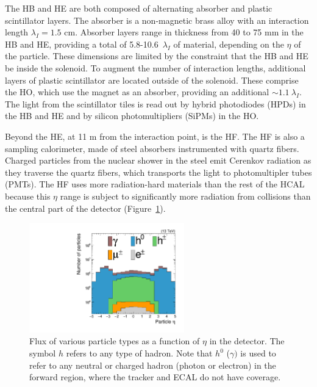 The HB and HE are both composed of alternating absorber and plastic scintillator layers.
The absorber is a non-magnetic brass alloy with an interaction length $\lambda_I=1.5$ cm.
Absorber layers range in thickness from 40 to 75 mm in the HB and HE, providing a total of 5.8-10.6~$\lambda_I$ of material, depending on the $\eta$ of the particle.
These dimensions are limited by the constraint that the HB and HE be inside the solenoid. 
To augment the number of interaction lengths, additional layers of plastic scintillator are located outside of the solenoid.
These comprise the HO, which use the magnet as an absorber, providing an additional $\sim 1.1~\lambda_I$.
The light from the scintillator tiles is read out by hybrid photodiodes (HPDs) in the HB and HE and by silicon photomultipliers (SiPMs) in the HO. 

Beyond the HE, at 11 m from the interaction point, is the HF.
The HF is also a sampling calorimeter, made of steel absorbers instrumented with quartz fibers.
Charged particles from the nuclear shower in the steel emit Cerenkov radiation as they traverse the quartz fibers, which transports the light to photomultipler tubes (PMTs).
The HF uses more radiation-hard materials than the rest of the HCAL because this $\eta$ range is subject to significantly more radiation from collisions than the central part of the detector (Figure~\ref{fig:cms:flux}). 

\begin{figure}[]
    \begin{center}
        \includegraphics[width=0.6\textwidth]{figures/cms/flux.pdf}
        \caption{Flux of various particle types as a function of $\eta$ in the detector.
             The symbol $h$ refers to any type of hadron.
             Note that $h^0$ ($\gamma)$ is used to refer to any neutral or charged hadron (photon or electron) in the forward region, where the tracker and ECAL do not have coverage.}
        \label{fig:cms:flux}
    \end{center}
\end{figure}

